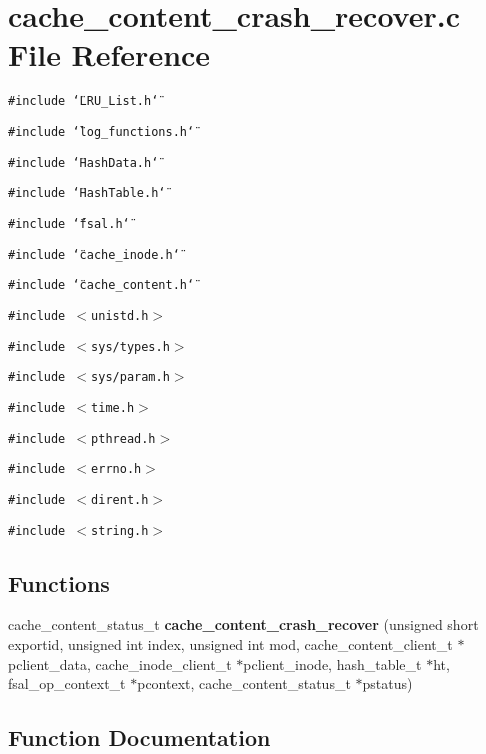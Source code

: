 \section{cache\_\-content\_\-crash\_\-recover.c File Reference}
\label{cache__content__crash__recover_8c}
{\tt \#include \char`\"{}LRU\_\-List.h\char`\"{}}\par
{\tt \#include \char`\"{}log\_\-functions.h\char`\"{}}\par
{\tt \#include \char`\"{}Hash\-Data.h\char`\"{}}\par
{\tt \#include \char`\"{}Hash\-Table.h\char`\"{}}\par
{\tt \#include \char`\"{}fsal.h\char`\"{}}\par
{\tt \#include \char`\"{}cache\_\-inode.h\char`\"{}}\par
{\tt \#include \char`\"{}cache\_\-content.h\char`\"{}}\par
{\tt \#include $<$unistd.h$>$}\par
{\tt \#include $<$sys/types.h$>$}\par
{\tt \#include $<$sys/param.h$>$}\par
{\tt \#include $<$time.h$>$}\par
{\tt \#include $<$pthread.h$>$}\par
{\tt \#include $<$errno.h$>$}\par
{\tt \#include $<$dirent.h$>$}\par
{\tt \#include $<$string.h$>$}\par
\subsection*{Functions}
\begin{CompactItemize}
\item 
cache\_\-content\_\-status\_\-t {\bf cache\_\-content\_\-crash\_\-recover} (unsigned short exportid, unsigned int index, unsigned int mod, cache\_\-content\_\-client\_\-t $\ast$pclient\_\-data, cache\_\-inode\_\-client\_\-t $\ast$pclient\_\-inode, hash\_\-table\_\-t $\ast$ht, fsal\_\-op\_\-context\_\-t $\ast$pcontext, cache\_\-content\_\-status\_\-t $\ast$pstatus)
\end{CompactItemize}


\subsection{Function Documentation}
